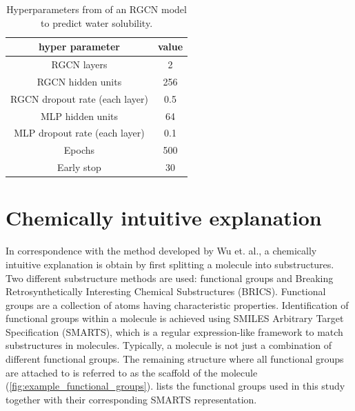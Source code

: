 \begin{table}[h]
    \caption{ Hyperparameters from \protect{} of an RGCN model to predict water solubility.}
    \label{tab:hyperparameters}
    \begin{center}
        \begin{tabular}{cc}
            \toprule
            \textbf{hyper parameter} & \textbf{value} \\
            \midrule
            RGCN layers & 2 \\
            RGCN hidden units & 256 \\
            RGCN dropout rate (each layer) & 0.5 \\
            MLP hidden units & 64 \\
            MLP dropout rate (each layer) & 0.1 \\ 
            Epochs & 500 \\
            Early stop & 30 \\
            \bottomrule
        \end{tabular}
    \end{center}
\end{table}


\newpage

\section{Chemically intuitive explanation}


In correspondence with the method developed by Wu et. al., a chemically intuitive 
explanation is obtain by first splitting a molecule into substructures.\cite{wu2023chemistry}
Two different substructure methods are used: functional groups and Breaking Retrosynthetically 
Interesting Chemical Substructures (BRICS). Functional groups are a collection of atoms 
having characteristic properties. Identification of functional groups within a molecule 
is achieved using SMILES Arbitrary Target Specification (SMARTS), which is a regular 
expression-like framework to match substructures in molecules.\cite{smartsDaylight}
Typically, a molecule is not just a combination of different functional groups. The 
remaining structure where all functional groups are attached to is referred to as the 
scaffold of the molecule (\cref{fig:example_functional_groups}).  
lists the functional groups used in this study together with their corresponding SMARTS
representation. 


